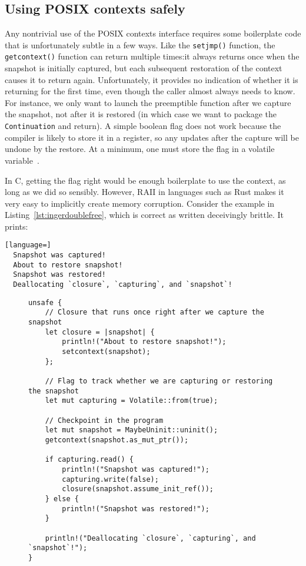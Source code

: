 \subsection{Using POSIX contexts safely}

Any nontrivial use of the POSIX contexts interface requires some boilerplate code
that is unfortunately subtle in a few ways.  Like the \texttt{setjmp()} function, the
\texttt{getcontext()} function can return multiple times:\@ it always returns once
when the snapshot is initially captured, but each subsequent restoration of the
context causes it to return again.  Unfortunately, it provides no indication of
whether it is returning for the first time, even though the caller almost always
needs to know.  For instance, we only want to launch the preemptible function after
we capture the snapshot, not after it is restored (in which case we want to package
the \texttt{Continuation} and return).  A simple boolean flag does not work because
the compiler is likely to store it in a register, so any updates after the capture
will be undone by the restore.  At a minimum, one must store the flag in a volatile
variable~\cite{getcontext-manpage}.

In C, getting the flag right would be enough boilerplate to use the context, as long
as we did so sensibly.  However, RAII in languages such as Rust makes it very easy to
implicitly create memory corruption.  Consider the example in
Listing~\ref{lst:ingerdoublefree}, which is correct as written deceivingly brittle.
It prints:
\begin{lstlisting}[language=]
  Snapshot was captured!
  About to restore snapshot!
  Snapshot was restored!
  Deallocating `closure`, `capturing`, and `snapshot`!
\end{lstlisting}

\begin{figure}
\begin{lstlisting}[label=lst:ingerdoublefree,caption=Subtly unsound use of POSIX contexts from Rust,morekeywords={let,mut,unsafe}]
unsafe {
	// Closure that runs once right after we capture the snapshot
	let closure = |snapshot| {
		println!("About to restore snapshot!");
		setcontext(snapshot);
	};

	// Flag to track whether we are capturing or restoring the snapshot
	let mut capturing = Volatile::from(true);

	// Checkpoint in the program
	let mut snapshot = MaybeUninit::uninit();
	getcontext(snapshot.as_mut_ptr());

	if capturing.read() {
		println!("Snapshot was captured!");
		capturing.write(false);
		closure(snapshot.assume_init_ref());
	} else {
		println!("Snapshot was restored!");
	}

	println!("Deallocating `closure`, `capturing`, and `snapshot`!");
}
\end{lstlisting}
\end{figure}

